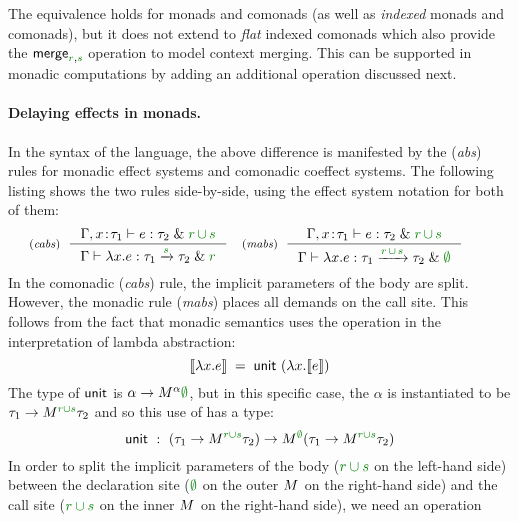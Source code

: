 The equivalence holds for monads and comonads (as well as \emph{indexed} monads
and comonads), but it does not extend to \emph{flat} indexed comonads which also provide
the $\ident{merge}_{\cclrd{r}, \cclrd{s}}$ operation to model context merging. This can be
supported in monadic computations by adding an additional operation discussed next.

\paragraph{Delaying effects in monads.}
In the syntax of the language, the above difference is manifested by the (\emph{abs}) rules for
monadic effect systems and comonadic coeffect systems. The following listing shows the two rules
side-by-side, using the effect system notation for both of them:
%
\begin{equation*}
\tyrule{cabs}
  { \Gamma, x\!:\!\tau_1 \vdash e : \tau_2 \;\&\; \cclrd{r}\,\cclrd{\cup}\,\cclrd{s} }
  { \Gamma \vdash \lambda x.e : \tau_1 \xrightarrow{\cclrd{s}} \tau_2 \;\&\; \cclrd{r}}
\quad
\tyrule{mabs}
  { \Gamma, x\!:\!\tau_1 \vdash e : \tau_2 \;\&\; \cclrd{r}\,\cclrd{\cup}\,\cclrd{s}}
  { \Gamma \vdash \lambda x.e : \tau_1 \xrightarrow{\cclrd{r}\,\cclrd{\cup}\,\cclrd{s}} \tau_2 \;\&\; \cclrd{\emptyset} }
\qquad
\end{equation*}
%
In the comonadic (\emph{cabs}) rule, the implicit parameters of the body are split. However,
the monadic rule (\emph{mabs}) places all demands on the call site. This follows from the
fact that monadic semantics uses the  operation in the interpretation of lambda abstraction:
%
\begin{equation*}
\sem{\lambda x.e} \;=\; \ident{unit}~(\lambda x. \sem{e})
\end{equation*}
%
The type of $\textnormal{\sffamily unit}$ is $\alpha\rightarrow\mtyp{\alpha}{\cclrd{\emptyset}}$, but in this specific
case, the $\alpha$ is instantiated to be $\tau_1\rightarrow\mtyp{\cclrd{r \cup s}}{\tau_2}$ and so this
use of  has a type:
%
\begin{equation*}
\ident{unit}~:~(\tau_1\rightarrow\mtyp{\cclrd{r \cup s}}{\tau_2}) \rightarrow \mtyp{\cclrd{\emptyset}}(\tau_1\rightarrow\mtyp{\cclrd{r \cup s}}{\tau_2})
\end{equation*}
%
In order to split the implicit parameters of the body ($\cclrd{r \cup s}$ on the left-hand side) between
the declaration site ($\cclrd{\emptyset}$ on the outer $\mtyp{}$ on the right-hand side) and the
call site ($\cclrd{r \cup s}$ on the inner $\mtyp{}$ on the right-hand side), we need an operation

